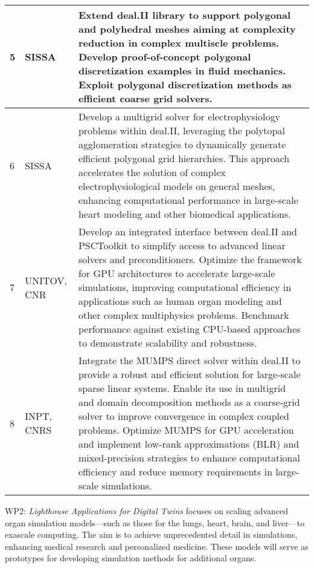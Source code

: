 \documentclass[a4paper,12pt]{article}
\begin{document}
\begin{center}
\begin{longtable}{|l|p{2.5cm}|p{12cm}|}
    \\
    \hline
    5 & SISSA &
    Extend deal.II library to support polygonal and polyhedral meshes aiming at complexity reduction in complex multiscle problems. Develop proof-of-concept polygonal discretization examples in fluid mechanics. Exploit polygonal discretization methods as efficient coarse grid solvers.
    \\
    \hline
    6 & SISSA &
    Develop a multigrid solver for electrophysiology problems within deal.II, leveraging the polytopal agglomeration strategies to dynamically generate efficient polygonal grid hierarchies. This approach accelerates the solution of complex electrophysiological models on general meshes, enhancing computational performance in large-scale heart modeling and other biomedical applications.  
    \\
    \hline
    7 & UNITOV, CNR &
    Develop an integrated interface between deal.II and PSCToolkit to simplify access to advanced linear solvers and preconditioners. Optimize the framework for GPU architectures to accelerate large-scale simulations, improving computational efficiency in applications such as human organ modeling and other complex multiphysics problems. Benchmark performance against existing CPU-based approaches to demonstrate scalability and robustness.
    \\
    \hline
    8 & INPT, CNRS &
    Integrate the MUMPS direct solver within deal.II to provide a robust and efficient solution for large-scale sparse linear systems. Enable its use in multigrid and domain decomposition methods as a coarse-grid solver to improve convergence in complex coupled problems. Optimize MUMPS for GPU acceleration and implement low-rank approximations (BLR) and mixed-precision strategies to enhance computational efficiency and reduce memory requirements in large-scale simulations.
    \\
    \hline
    \end{longtable}
\end{center}

\newpage

WP2: \textit{Lighthouse Applications for Digital Twins} focuses on scaling advanced organ simulation models—such as those for the lungs, heart, brain, and liver—to exascale computing. The aim is to achieve unprecedented detail in simulations, enhancing medical research and personalized medicine. These models will serve as prototypes for developing simulation methods for additional organs.
\end{document}
